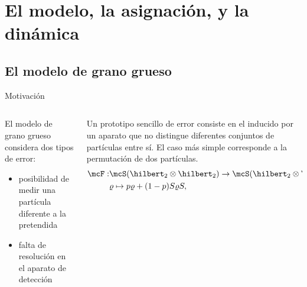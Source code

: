 \section{El modelo, la asignación, y la dinámica}
\iffalse
\subsection{El modelo de grano grueso}

\begin{frame}{Motivación}
    \begin{columns}
        \begin{column}
            El modelo de grano grueso considera dos tipos de error:
            \begin{itemize}
                \item posibilidad de medir una partícula diferente a la pretendida
                \item falta de resolución en el aparato de detección
            \end{itemize} 
        \end{column}
        \begin{column}
            Un prototipo sencillo de error consiste en el inducido por un aparato que no distingue diferentes conjuntos de partículas entre sí. El caso más simple corresponde a la permutación de dos partículas.
            \begin{align}
                \mcF:&\mcS(\hilbert_2 \otimes \hilbert_2)\to \mcS(\hilbert_2 \otimes \hilbert_2)\nonumber\\
                &\varrho \mapsto p\varrho+(1-p)S\varrho S,\nonumber
            \end{align}
        \end{column}
    \end{columns}
\end{frame}

